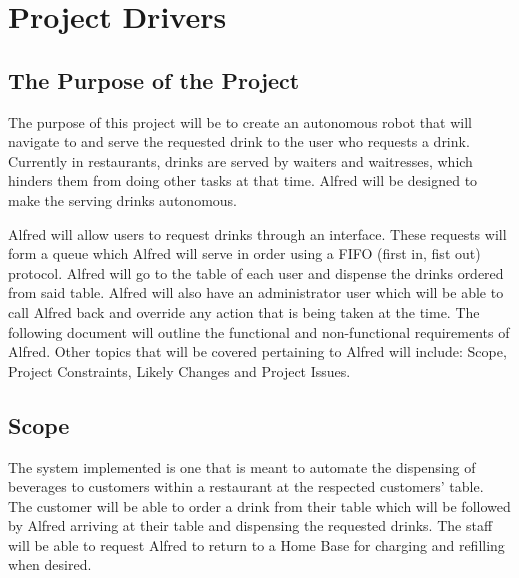 \documentclass [11pt]{article}
\begin{document}
\pagebreak



\section {\textbf{Project Drivers}}

\subsection{The Purpose of the Project} 
The purpose of this project will be to create an autonomous robot that will navigate to and serve the requested drink to the user who requests a drink. Currently in restaurants, drinks are served by waiters and waitresses, which hinders them from doing other tasks at that time. Alfred will be designed to make the serving drinks autonomous. \newline

Alfred will allow users to request drinks through an interface. These requests will form a queue which Alfred will serve in order using a FIFO (first in, fist out) protocol. Alfred will go to the table of each user and dispense the drinks ordered from said table. Alfred will also have an administrator user which will be able to call Alfred back and override any action that is being taken at the time. The following document will outline the functional and non-functional requirements of Alfred.  Other topics that will be covered pertaining to Alfred will include: Scope, Project Constraints, Likely Changes and Project Issues.

\subsection{Scope}
The system implemented is one that is meant to automate the dispensing of beverages to customers within a restaurant at the respected customers' table. The customer will be able to order a drink from their table which will be followed by Alfred arriving at their table and dispensing the requested drinks. The staff will be able to request Alfred to return to a Home Base for charging and refilling when desired. 
\end{document}
